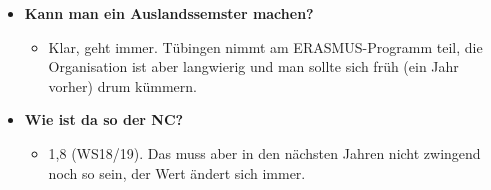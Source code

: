 \begin{large}
\begin{itemize}
	\item \textbf{Kann man ein Auslandssemster machen?}
	\begin{itemize}
		\item  Klar, geht immer. Tübingen nimmt am ERASMUS-Programm teil, die Organisation ist aber langwierig und man sollte sich früh (ein Jahr vorher) drum kümmern.
	\end{itemize}
\end{itemize}

\begin{itemize}
	\item \textbf{Wie ist da so der NC?}
	\begin{itemize}
		\item 1,8 (WS18/19). Das muss aber in den nächsten Jahren nicht zwingend noch so sein, der Wert ändert sich immer.
	\end{itemize}
\end{itemize}

\end{large}